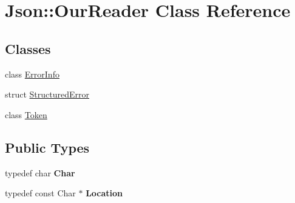 \hypertarget{class_json_1_1_our_reader}{}\section{Json\+:\+:Our\+Reader Class Reference}
\label{class_json_1_1_our_reader}
\subsection*{Classes}
\begin{DoxyCompactItemize}
\item 
class \hyperlink{class_json_1_1_our_reader_1_1_error_info}{Error\+Info}
\item 
struct \hyperlink{struct_json_1_1_our_reader_1_1_structured_error}{Structured\+Error}
\item 
class \hyperlink{class_json_1_1_our_reader_1_1_token}{Token}
\end{DoxyCompactItemize}
\subsection*{Public Types}
\begin{DoxyCompactItemize}
\item 
\hypertarget{class_json_1_1_our_reader_a0cd0bab4caa66594ab843ccd5f9dc239}{}typedef char {\bfseries Char}\label{class_json_1_1_our_reader_a0cd0bab4caa66594ab843ccd5f9dc239}

\item 
\hypertarget{class_json_1_1_our_reader_a1bdc7bbc52ba87cae6b19746f2ee0189}{}typedef const Char $\ast$ {\bfseries Location}\label{class_json_1_1_our_reader_a1bdc7bbc52ba87cae6b19746f2ee0189}

\end{DoxyCompactItemize}
